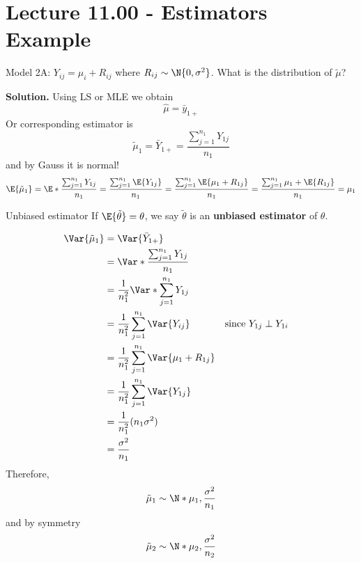 \section{Lecture 11.00 - Estimators Example}
\begin{Example}{}{}
    Model 2A\@: $ Y_{ij}=\mu_i+R_{ij} $ where $ R_{ij} \sim \N{0,\sigma^2} $.
    What is the distribution of $ \tilde{\mu} $?

    \textbf{Solution.} Using LS or MLE we obtain
    \[ \hat{\mu}=\bar{y}_{1+} \]
    Or corresponding estimator is
    \[ \tilde{\mu}_1=\bar{Y}_{1+}=\frac{\sum_{j=1}^{n_1}Y_{1j}}{n_1}  \]
    and by Gauss it is normal!
    \[
        \E{\tilde{\mu}_1}
        =\E*{\frac{\sum_{j=1}^{n_1} Y_{1j}}{n_1}}
        =\frac{\sum_{j=1}^{n_1}\E{Y_{1j}}}{n_1}
        =\frac{\sum_{j=1}^{n_1} \E{\mu_1+R_{1j}}}{n_1}
        =\frac{\sum_{j=1}^{n_1} \mu_1+\E{R_{1j}}}{n_1}
        =\mu_1
    \]
    \begin{Definition}{Unbiased estimator}{}
        If $ \E{\tilde{\theta}}=\theta $, we say $ \tilde{\theta} $
        is an \textbf{unbiased estimator} of $ \theta $.
    \end{Definition}
    \begin{align*}
        \Var{\tilde{\mu}_1}
         & =\Var{\bar{Y}_{1+}}                                                                       \\
         & =\Var*{\frac{\sum_{j=1}^{n_1} Y_{1j}}{n_1} }                                              \\
         & =\frac{1}{n_1^2}\Var*{\sum_{j=1}^{n_1} Y_{1j}}                                            \\
         & =\frac{1}{n_1^2} \sum_{j=1}^{n_1} \Var{Y_{ij}}       &  & \text{since }Y_{1j}\perp Y_{1i} \\
         & =\frac{1}{n_1^2} \sum_{j=1}^{n_1} \Var{\mu_1+R_{1j}}                                      \\
         & =\frac{1}{n_1^2} \sum_{j=1}^{n_1} \Var{Y_{1j}}                                            \\
         & =\frac{1}{n_1^2} (n_1\sigma^2)                                                            \\
         & =\frac{\sigma^2}{n_1}
    \end{align*}
    Therefore,
    \[ \tilde{\mu}_1\sim \N*{\mu_1,\frac{\sigma^2}{n_1}} \]
    and by symmetry
    \[ \tilde{\mu}_2 \sim \N*{\mu_2,\frac{\sigma^2}{n_2}} \]
\end{Example}
